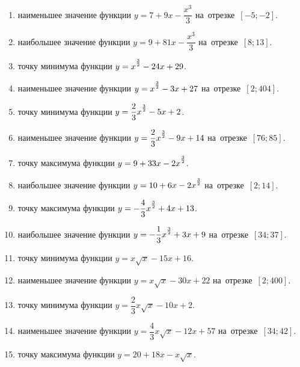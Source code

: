 \documentclass[a4paper,10pt]{article}
\begin{document}
\begin{enumerate}
\item {} наименьшее значение функции $y=7 +9x-\dfrac{x^3}{3}$ на~отрезке~$\left[-5;-2\right]$.

\item {} наибольшее значение функции $y=9 +81x-\dfrac{x^3}{3}$ на~отрезке~$\left[8;13\right]$.

\item {} точку минимума функции $y=x\strut^{\frac{3}{2}} -24x+29$.

\item {} наименьшее значение функции $y=x\strut^{\frac{3}{2}} -3x+27$ на~отрезке~$\left[2;404\right]$.

\item {} точку минимума функции $y=\dfrac{2}{3}x\strut^{\frac{3}{2}} -5x+2$.

\item {} наименьшее значение функции $y=\dfrac{2}{3}x\strut^{\frac{3}{2}} -9x+14$ на~отрезке~$\left[76;85\right]$.

\item {} точку максимума функции $y=9+33x-2x\strut^{\frac{3}{2}}$.

\item {} наибольшее значение функции $y=10+6x-2x\strut^{\frac{3}{2}}$ на~отрезке~$\left[2;14\right]$.

\item {} точку максимума функции $y=-\dfrac{4}{3}x\strut^{\frac{3}{2}} +4x+13$.

\item {} наибольшее значение функции $y=-\dfrac{1}{3}x\strut^{\frac{3}{2}} +3x+9$ на~отрезке~$\left[34;37\right]$.

\item {} точку минимума функции $y=x\sqrt{x} -15x+16$.

\item {} наименьшее значение функции $y=x\sqrt{x} -30x+22$ на~отрезке~$\left[2;400\right]$.

\item {} точку минимума функции $y=\dfrac{2}{3}x\sqrt{x} -10x+2$.

\item {} наименьшее значение функции $y=\dfrac{4}{3}x\sqrt{x} -12x+57$ на~отрезке~$\left[34;42\right]$.

\item {} точку максимума функции $y=20+18x -x\sqrt{x}$.


\end{enumerate}
\end{document}
